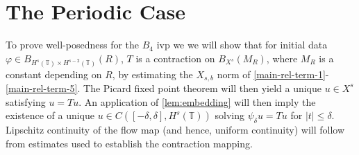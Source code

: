 \documentclass[12pt,reqno]{amsart}
\numberwithin{equation}{section}  %
\newcommand{\ci}{\mathbb{T}}
\newcommand{\vp}{\varphi}
\begin{document}
\section{The Periodic Case} 
\label{sec:periodic}
%
%
To prove well-posedness for the $B_4$ ivp we we will 
show that for initial data $\vp \in B_{H^{s}(\ci) \times H^{s-2}(\ci)}(R)$, $T$ is a contraction on
$B_{X^{s}}(M_{R})$, where $M_{R}$ is a constant depending on $R$, 
by estimating the $X_{s,b}$
norm of \eqref{main-rel-term-1}-\eqref{main-rel-term-5}. The 
Picard fixed point theorem will
then yield a unique $u \in X^{s}$ satisfying $u = Tu$.
An application of
\cref{lem:embedding} will then imply the existence of a unique
$u \in C([-\delta, \delta], H^s(\ci))$ solving $\psi_{\delta} u = Tu$ for $| t | \le \delta$.
Lipschitz continuity of the flow map (and hence, uniform
continuity) will follow from estimates used to establish the contraction
mapping. 
%
%
%
%
%
%
%
%
%
\end{document}
